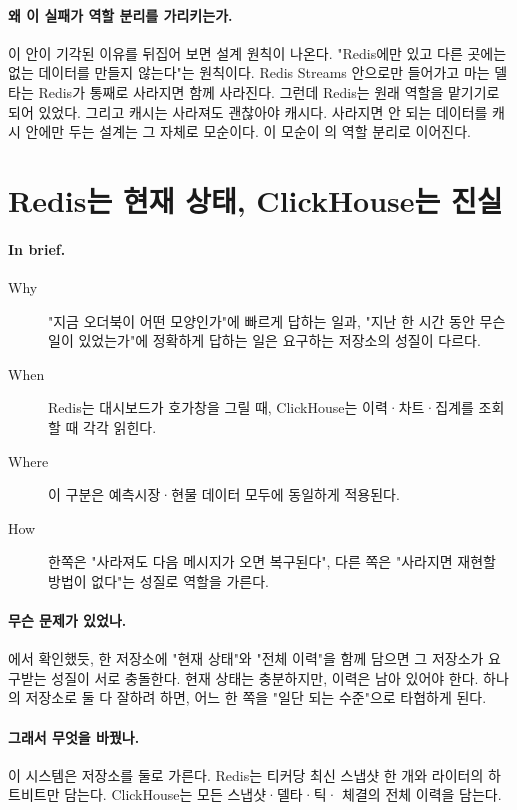 \paragraph{왜 이 실패가 역할 분리를 가리키는가.} 이 안이 기각된 이유를 뒤집어 보면
설계 원칙이 나온다. "Redis에만 있고 다른 곳에는 없는 데이터를 만들지 않는다"는
원칙이다. Redis Streams 안으로만 들어가고 마는 델타는 Redis가 통째로 사라지면 함께
사라진다. 그런데 Redis는 원래  역할을 맡기기로 되어 있었다. 그리고
캐시는 사라져도 괜찮아야 캐시다. 사라지면 안 되는 데이터를 캐시 안에만 두는 설계는
그 자체로 모순이다. 이 모순이 의 역할 분리로 이어진다.

\section{Redis는 현재 상태, ClickHouse는 진실}
\label{sec:arch-redis-vs-ch}

\paragraph{In brief.}
\begin{description}
  \item[Why] "지금 오더북이 어떤 모양인가"에 빠르게 답하는 일과, "지난 한 시간 동안
    무슨 일이 있었는가"에 정확하게 답하는 일은 요구하는 저장소의 성질이 다르다.
  \item[When] Redis는 대시보드가 호가창을 그릴 때, ClickHouse는 이력·차트·집계를
    조회할 때 각각 읽힌다.
  \item[Where] 이 구분은 예측시장·현물 데이터 모두에 동일하게 적용된다.
  \item[How] 한쪽은 "사라져도 다음 메시지가 오면 복구된다", 다른 쪽은 "사라지면
    재현할 방법이 없다"는 성질로 역할을 가른다.
\end{description}

\paragraph{무슨 문제가 있었나.} 에서 확인했듯, 한 저장소에
"현재 상태"와 "전체 이력"을 함께 담으면 그 저장소가 요구받는 성질이 서로 충돌한다.
현재 상태는  충분하지만, 이력은  남아 있어야 한다. 하나의 저장소로 둘 다 잘하려 하면, 어느 한
쪽을 "일단 되는 수준"으로 타협하게 된다.

\paragraph{그래서 무엇을 바꿨나.} 이 시스템은 저장소를 둘로 가른다. Redis는 티커당
최신 스냅샷 한 개와 라이터의 하트비트만 담는다. ClickHouse는 모든 스냅샷·델타·틱·
체결의 전체 이력을 담는다.

